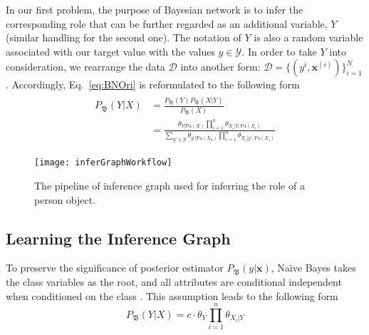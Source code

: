 In our first problem, the purpose of Bayesian network is to infer the corresponding role that can be further regarded as an additional variable, \eg $Y$ (similar handling for the second one). 
The notation of $Y$ is also a random variable associated with our target value with the values $y\in\mathcal{Y}$. 
In order to take $Y$ into consideration, we rearrange the data $\mathcal{D}$ into another form: $\mathcal{D}=\{(y^{i}, \mathbf{x}^{(i)})\}_{i=1}^N$. Accordingly, Eq.~\eqref{eq:BNOri} is reformulated to the following form 
\vspace{-1ex}
\begin{align}\label{eq:BNWithCls}
\begin{split}
P_\mathfrak{B}(Y|{X}) & = 
\frac{ P_\mathfrak{B}(Y) P_\mathfrak{B}({X}|Y) }{P_\mathfrak{B}({X})}\\
&=\frac{ \theta_{Y|\text{Pa}({X})} \prod_{i=1}^{n} \theta_{X_i|Y, \text{Pa}({X}_i)} }{ \sum_{y'\in \mathcal{Y}} \theta_{y'|\text{Pa}({X}_0)} \prod_{i=1}^{n} \theta_{X_i|y', \text{Pa}({X}_i)} }
\end{split}
\end{align}
\vspace{-1ex}

\begin{figure}[tb]
\centering
\texttt{[image: inferGraphWorkflow]}
\caption{The pipeline of inference graph used for inferring the role of a person object.}
\vspace{-4ex}
\label{fig:inferGraphWorkflow}
\end{figure}


\subsection{Learning the Inference Graph}
To preserve the significance of posterior estimator $P_\mathfrak{B}(y|\mathbf{x})$, 
Na\"{i}ve Bayes takes the class variables as the root, and all attributes are conditional independent when conditioned on the class \cite{petitjean2018accurate}. This assumption leads to the following form
\vspace{-1ex}
\begin{equation}\label{eq:BN-naiveBayes}
P_\mathfrak{B}(Y| {X}) = c \cdot \theta_Y \prod_{i=1}^{n}\theta_{X_i|Y}
\end{equation}
\vspace{-1ex}

